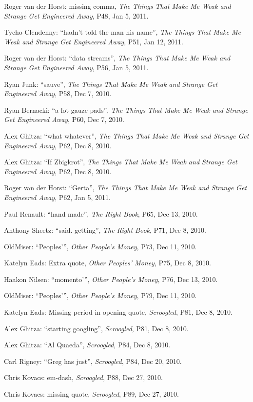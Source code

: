 \begin{flushleft}
Roger van der Horst: missing comma, \emph{The Things That Make Me Weak 
and Strange Get Engineered Away}, P48, Jan 5, 2011.

Tycho Clendenny: “hadn't told the man his name”, \emph{The Things 
That Make Me Weak and Strange Get Engineered Away}, P51, Jan 12, 2011.

Roger van der Horst: “data streams”, \emph{The Things That Make Me 
Weak and Strange Get Engineered Away}, P56, Jan 5, 2011.

Ryan Junk: “sauve”, \emph{The Things That Make Me Weak and Strange 
Get Engineered Away}, P58, Dec 7, 2010.

Ryan Bernacki: “a lot gauze pads”, \emph{The Things That Make Me 
Weak and Strange Get Engineered Away}, P60, Dec 7, 2010.

Alex Ghitza: “what whatever”, \emph{The Things That Make Me Weak 
and Strange Get Engineered Away}, P62, Dec 8, 2010.

Alex Ghitza: “If Zbigkrot”, \emph{The Things That Make Me Weak and 
Strange Get Engineered Away}, P62, Dec 8, 2010.

Roger van der Horst: “Gerta”, \emph{The Things That Make Me Weak 
and Strange Get Engineered Away}, P62, Jan 5, 2011.

Paul Renault: “hand made”, \emph{The Right Book}, P65, Dec 13, 2010.

Anthony Sheetz: “said. getting”, \emph{The Right Book}, P71, Dec 8, 
2010.

OldMiser: “Peoples'”, \emph{Other People's Money}, P73, Dec 11, 
2010.

Katelyn Eads: Extra quote, \emph{Other Peoples' Money}, P75, Dec 8, 
2010.

Haakon Nilsen: “momento'”, \emph{Other People's Money}, P76, Dec 
13, 2010.

OldMiser: “Peoples'”, \emph{Other People's Money}, P79, Dec 11, 
2010.

Katelyn Eads: Missing period in opening quote, \emph{Scroogled}, P81, 
Dec 8, 2010.

Alex Ghitza: “starting googling”, \emph{Scroogled}, P81, Dec 8, 
2010.

Alex Ghitza: “Al Quaeda”, \emph{Scroogled}, P84, Dec 8, 2010.

Carl Rigney: “Greg has just”, \emph{Scroogled}, P84, Dec 20, 2010.

Chris Kovacs: em-dash, \emph{Scroogled}, P88, Dec 27, 2010.

Chris Kovacs: missing quote, \emph{Scroogled}, P89, Dec 27, 2010.


\end{flushleft}
